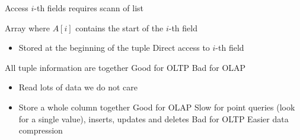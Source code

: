 \begin{itemize}
\begin{itemize}
\begin{itemize}
\begin{itemize}
\begin{itemize}
                                    \icon Access $i$-th fields requires scann of list
                                \end{itemize}
                             Array where $A[i]$ contains the start of the $i$-th field
                                \begin{itemize}
                                    \item Stored at the beginning of the tuple
                                    \ipro Direct access to $i$-th field
                                \end{itemize}
                        \end{itemize}
                \end{itemize}
            \ipro All tuple information are together
            \ipro Good for OLTP
            \icon Bad for OLAP
                \begin{itemize}
                    \item Read lots of data we do not care
                \end{itemize}
        \end{itemize}
        \begin{itemize}
            \item Store a whole column together
            \ipro Good for OLAP
            \icon Slow for point queries (look for a single value), inserts, updates and deletes
            \icon Bad for OLTP
            \ipro Easier data compression
        \end{itemize}
\end{itemize}

